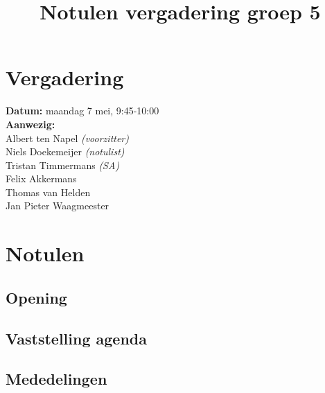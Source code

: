 \documentclass[a4paper]{article}
\title{ Notulen vergadering groep 5 }
\begin{document}
\maketitle

\section*{Vergadering}
{\bf Datum:} maandag 7 mei, 9:45-10:00 \\
{\bf Aanwezig:}\\
Albert ten Napel {\it (voorzitter)} \\
Niels Doekemeijer {\it (notulist)} \\
Tristan Timmermans {\it (SA)} \\
Felix Akkermans \\
Thomas van Helden \\
Jan Pieter Waagmeester \\

\section*{Notulen}

\subsection*{Opening}

\subsection*{Vaststelling agenda}

\subsection*{Mededelingen}
\end{document}
